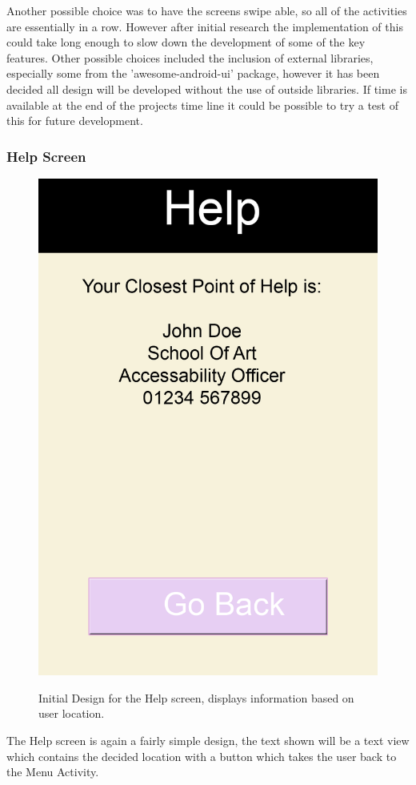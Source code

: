 Another possible choice was to have the screens swipe able, so all of the activities are essentially in a row. However after initial research the implementation of this could take long enough to slow down the development of some of the key features. Other possible choices included the inclusion of external libraries, especially some from the 'awesome-android-ui'\cite{aui} package, however it has been decided all design will be developed without the use of outside libraries. If time is available at the end of the projects time line it could be possible to try a test of this for future development. 
\subsubsection{Help Screen}
\begin{figure}[h]
\includegraphics[scale=0.6]{Design/Help.png} \\
\caption[Initial Help Design]{Initial Design for the Help screen, displays information based on user location.}
\end{figure}
The Help screen is again a fairly simple design, the text shown will be a text view which contains the decided location with a button which takes the user back to the Menu Activity. 
\newpage

